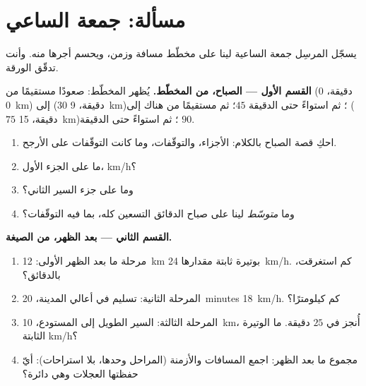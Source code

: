 \section{مسألة: جمعة الساعي}

\begin{problem}\label{pb:g7:motion-average-speed:1}
يسجّل المرسِل جمعة الساعية لينا على مخطّط مسافة وزمن، ويحسم
أجرها منه. وأنت تدقّق الورقة.

\medskip\noindent\textbf{القسم الأول --- الصباح، من المخطّط.}
يُظهر المخطّط: صعودًا مستقيمًا من ($0$ دقيقة، \qty{0}{km}) إلى
($30$ دقيقة، \qty{9}{km})؛ ثم استواءً حتى الدقيقة $45$؛ ثم
مستقيمًا من هناك إلى ($75$ دقيقة، \qty{15}{km})؛ ثم استواءً حتى
الدقيقة $90$.
\begin{enumerate}
  \item احكِ قصة الصباح بالكلام: الأجزاء، والتوقّفات، وما كانت
        التوقّفات على الأرجح.
  \item ما  على الجزء الأول،  \unit{km/h}؟
  \item وما  على جزء السير الثاني؟
  \item وما \emph{متوسّط}  لينا على صباح الدقائق التسعين
        كله، بما فيه التوقّفات؟
\end{enumerate}

\medskip\noindent\textbf{القسم الثاني --- بعد الظهر، من
الصيغة.}
\begin{enumerate}[resume]
  \item مرحلة ما بعد الظهر الأولى: \qty{12}{km} بوتيرة ثابتة
        مقدارها \qty{24}{km/h}. كم استغرقت، بالدقائق؟
  \item المرحلة الثانية: تسليم في أعالي المدينة،
        \qty{20}{minutes}  \qty{18}{km/h}. كم كيلومترًا؟
  \item المرحلة الثالثة: السير الطويل إلى المستودع،
        \qty{10}{km}، أُنجز في $25$ دقيقة. ما  الوتيرة
        الثابتة  \unit{km/h}؟
  \item مجموع ما بعد الظهر: اجمع المسافات والأزمنة (المراحل
        وحدها، بلا استراحات): أيّ  حفظتها العجلات
        وهي دائرة؟
\end{enumerate}


\end{problem}

